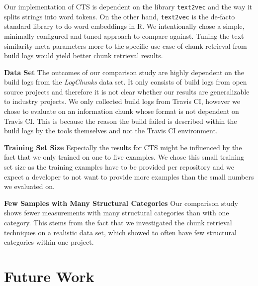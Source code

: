 Our implementation of CTS is dependent on the library {\tt text2vec}
and the way it splits strings into word tokens. On the other hand,
{\tt text2vec} is the de-facto standard library to do word embeddings
in R. We intentionally chose a simple, minimally configured and tuned
approach to compare against. Tuning the text similarity
meta-parameters more to the specific use case of chunk retrieval from
build logs would yield better chunk retrieval results.

\noindent
\textbf{Data Set}
The outcomes of our comparison study are highly dependent on the build
logs from the \emph{LogChunks} data set. It only consists of build
logs from open source projects and therefore it is not clear whether
our results are generalizable to industry projects. We only collected
build logs from Travis CI, however we chose to evaluate on an
information chunk whose format is not dependent on Travis CI\@. This
is because the reason the build failed is described within the build
logs by the tools themselves and not the Travis CI environment.

\noindent
\textbf{Training Set Size}
Especially the results for CTS might be influenced by the fact that we
only trained on one to five examples. We chose this small training set
size as the training examples have to be provided per repository and
we expect a developer to not want to provide more examples than the
small numbers we evaluated on.

\noindent
\textbf{Few Samples with Many Structural Categories}
Our comparison study shows fewer measurements with many structural
categories than with one category.
This stems from the fact that we investigated the chunk retrieval
techniques on a realistic data set, which showed to often have few
structural categories within one project.

\section{Future Work}

